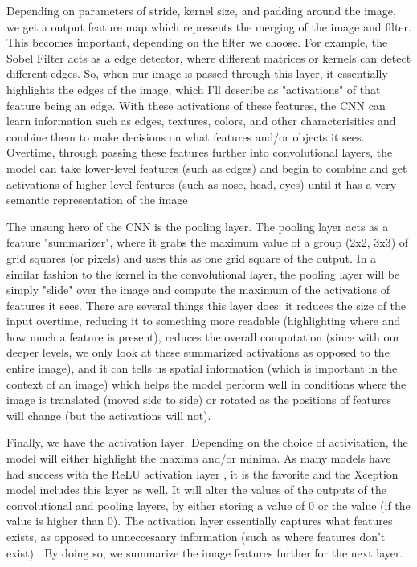 \documentclass[10pt,twocolumn]{article}
\begin{document}
Depending on parameters of stride, kernel size, and padding around the image, we get a output feature map which represents the merging of the image and filter. This becomes important, depending on the filter we choose. For example, the Sobel Filter \cite{} acts as a edge detector, where different matrices or kernels can detect different edges. So, when our image is passed through this layer, it essentially highlights the edges of the image, which I'll describe as "activations" of that feature being an edge. With these activations of these features, the CNN can learn information such as edges, textures, colors, and other characterisitics and combine them to make decisions on what features and/or objects it sees. Overtime, through passing these features further into convolutional layers, the model can take lower-level features (such as edges) and begin to combine and get activations of higher-level features (such as nose, head, eyes) until it has a very semantic representation of the image

The unsung hero of the CNN is the pooling layer. The pooling layer acts as a feature "summarizer", where it grabs the maximum value of a group (2x2, 3x3) of grid squares (or pixels) and uses this as one grid square of the output. In a similar fashion to the kernel in the convolutional layer, the pooling layer will be simply "slide" over the image and compute the maximum of the activations of features it sees. There are several things this layer does: it reduces the size of the input overtime, reducing it to something more readable (highlighting where and how much a feature is present), reduces the overall computation (since with our deeper levels, we only look at these summarized activations as opposed to the entire image), and it can tells us spatial information (which is important in the context of an image) which helps the model perform well in conditions where the image is translated (moved side to side) or rotated as the positions of features will change (but the activations will not).

Finally, we have the activation layer. Depending on the choice of activitation, the model will either highlight the maxima and/or minima. As many models have had success with the ReLU activation layer \cite{}, it is the favorite and the Xception model includes this layer as well. It will alter the values of the outputs of the convolutional and pooling layers, by either storing a value of 0 or the value (if the value is higher than 0). The activation layer essentially captures what features exists, as opposed to unneccesaary information (such as where features don't exist) \cite{}. By doing so, we summarize the image features further for the next layer.
\end{document}
